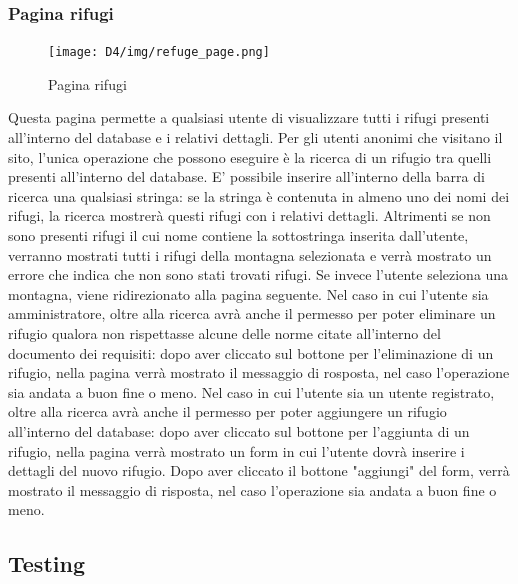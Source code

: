 \documentclass[a4paper,12pt]{article}
\begin{document}
\subsubsection{Pagina rifugi}
\begin{figure}[H]
    \centering
    \texttt{[image: D4/img/refuge\_page.png]}
    \caption{Pagina rifugi}
\end{figure}
Questa pagina permette a qualsiasi utente di visualizzare tutti i rifugi presenti all'interno del database e i relativi dettagli. \newline
Per gli utenti anonimi che visitano il sito, l'unica operazione che possono eseguire è la ricerca di un rifugio tra quelli presenti all'interno del database. \newline
E' possibile inserire all'interno della barra di ricerca una qualsiasi stringa: se la stringa è contenuta in almeno uno dei nomi dei rifugi, la ricerca mostrerà questi rifugi con i relativi dettagli. \newline
Altrimenti se non sono presenti rifugi il cui nome contiene la sottostringa inserita dall'utente, verranno mostrati tutti i rifugi della montagna selezionata e verrà mostrato un errore che indica che non sono stati trovati rifugi. \newline
Se invece l'utente seleziona una montagna, viene ridirezionato alla pagina seguente.
Nel caso in cui l'utente sia amministratore, oltre alla ricerca avrà anche il permesso per poter eliminare un rifugio qualora non rispettasse alcune delle norme citate all'interno del documento dei requisiti: dopo aver cliccato sul bottone per l'eliminazione di un rifugio, nella pagina verrà mostrato il messaggio di rosposta, nel caso l'operazione sia andata a buon fine o meno. \newline
Nel caso in cui l'utente sia un utente registrato, oltre alla ricerca avrà anche il permesso per poter aggiungere un rifugio all'interno del database: dopo aver cliccato sul bottone per l'aggiunta di un rifugio, nella pagina verrà mostrato un form in cui l'utente dovrà inserire i dettagli del nuovo rifugio. \newline
Dopo  aver cliccato il bottone "aggiungi" del form, verrà mostrato il messaggio di risposta, nel caso l'operazione sia andata a buon fine o meno.


\subsection{Testing}
\end{document}
